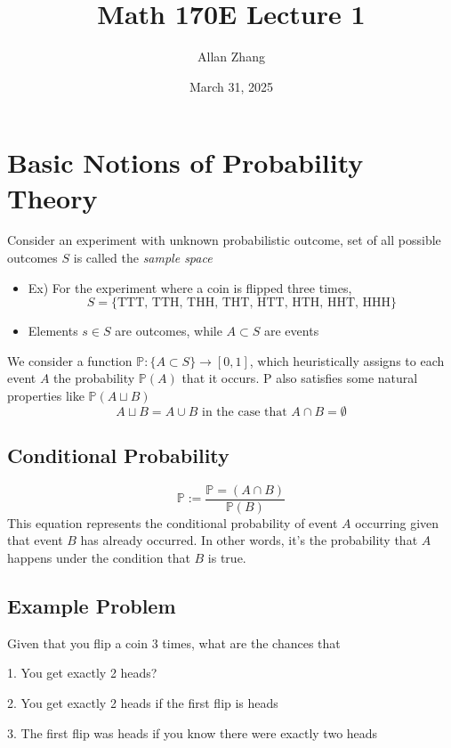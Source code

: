 \documentclass[hidelinks]{article}
\title{\textbf{Math 170E Lecture 1}}
\author{Allan Zhang}
\date{March 31, 2025}
\begin{document}
\hypersetup{bookmarksnumbered=true,}
\pagecolor{white}
\color{black}
\maketitle
\section*{Basic Notions of Probability Theory}
Consider an experiment with unknown probabilistic outcome, set of all possible outcomes $S$ is called the \textit{sample space}

\begin{itemize}

    \item[] Ex) For the experiment where a coin is flipped three times, 
\[
    S = \{\text{TTT, TTH, THH, THT, HTT, HTH, HHT, HHH}\}
\]

\item[] Elements $s\in S$ are outcomes, while $A \subset S$ are events
\end{itemize}
We consider a function $\mathbb{P}:\{A \subset S\} \rightarrow [0, 1]$, which heuristically assigns to each event $A$ the probability $\mathbb{P}(A)$ that it occurs. P also satisfies some natural properties like $\mathbb{P}(A\sqcup B)$
\[
A \sqcup B = A \cup B \text{ in the case that } A \cap B = \emptyset
\]

\subsection*{Conditional Probability}
\[\mathbb{P} := \frac{\mathbb{P} = (A \cap B)}{\mathbb{P}(B)}\]
This equation represents the conditional probability of event $A$ occurring given that event $B$ has already occurred. In other words, it's the probability that $A$ happens under the condition that $B$ is true.


\subsection*{Example Problem}
Given that you flip a coin 3 times, what are the chances that 

1. You get exactly 2 heads?

2. You get exactly 2 heads if the first flip is heads 

3. The first flip was heads if you know there were exactly two heads 
\vspace{0.3cm}
\end{document}
